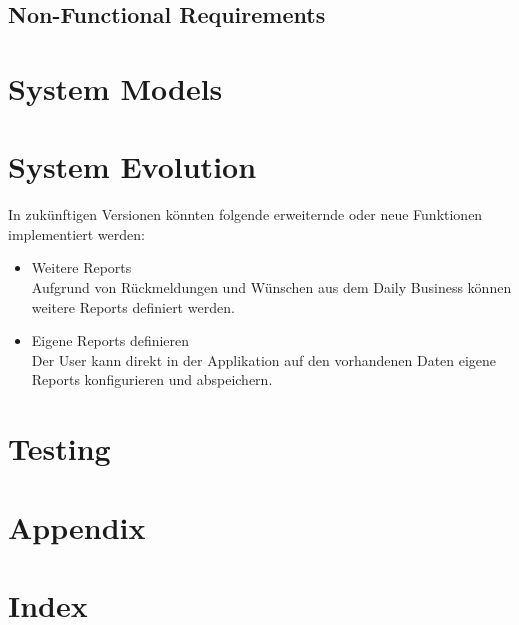 \documentclass[a4paper]{scrreprt}
\begin{document}
\section{Non-Functional Requirements}



\chapter{System Models}



\chapter{System Evolution}


In zukünftigen Versionen könnten folgende erweiternde oder neue Funktionen implementiert werden:
\begin{itemize}
\item Weitere Reports\\
Aufgrund von Rückmeldungen und Wünschen aus dem Daily Business können weitere Reports definiert werden.
\item Eigene Reports definieren\\
Der User kann direkt in der Applikation auf den vorhandenen Daten eigene Reports konfigurieren und abspeichern.
\end{itemize}

\chapter{Testing}



\chapter{Appendix}





\chapter{Index}
\end{document}
